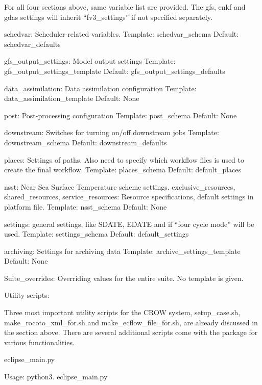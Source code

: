 For all four sections above, same variable list are provided. The gfs, enkf and gdas settings will inherit “fv3\-\_\-settings” if not specified separately.

schedvar\-: Scheduler-\/related variables. Template\-: schedvar\-\_\-schema Default\-: schedvar\-\_\-defaults

gfs\-\_\-output\-\_\-settings\-: Model output settings Template\-: gfs\-\_\-output\-\_\-settings\-\_\-template Default\-: gfs\-\_\-output\-\_\-settings\-\_\-defaults

data\-\_\-assimilation\-: Data assimilation configuration Template\-: data\-\_\-assimilation\-\_\-template Default\-: None

post\-: Post-\/processing configuration Template\-: post\-\_\-schema Default\-: None

downstream\-: Switches for turning on/off downstream jobs Template\-: downstream\-\_\-schema Default\-: downstream\-\_\-defaults

places\-: Settings of paths. Also need to specify which workflow files is used to create the final workflow. Template\-: places\-\_\-schema Default\-: default\-\_\-places

nsst\-: Near Sea Surface Temperature scheme settings. exclusive\-\_\-resources, shared\-\_\-resources, service\-\_\-resources\-: Resource specifications, default settings in platform file. Template\-: nsst\-\_\-schema Default\-: None

settings\-: general settings, like S\-D\-A\-T\-E, E\-D\-A\-T\-E and if “four cycle mode” will be used. Template\-: settings\-\_\-schema Default\-: default\-\_\-settings

archiving\-: Settings for archiving data Template\-: archive\-\_\-settings\-\_\-template Default\-: None

Suite\-\_\-overrides\-: Overriding values for the entire suite. No template is given.

Utility scripts\-:

Three most important utility scripts for the C\-R\-O\-W system, setup\-\_\-case.\-sh, make\-\_\-rocoto\-\_\-xml\-\_\-for.\-sh and make\-\_\-ecflow\-\_\-file\-\_\-for.\-sh, are already discussed in the section above. There are several additional scripts come with the package for various functionalities.

eclipse\-\_\-main.\-py

Usage\-: python3. eclipse\-\_\-main.\-py

